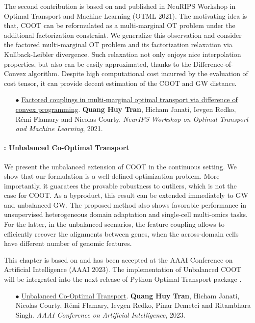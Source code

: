 The second contribution is based on \citep{Tran21} and published in NeuRIPS Workshop in Optimal
Transport and Machine Learning (OTML 2021). The motivating idea is that,
COOT can be reformulated as a multi-marginal OT problem under the additional factorization constraint.
We generalize this observation and consider the factored multi-marginal OT problem
and its factorization relaxation via Kullback-Leibler divergence.
Such relaxation not only enjoys nice interpolation properties, but also
can be easily approximated, thanks to the Difference-of-Convex algorithm.
Despite high computational cost incurred by the evaluation of cost tensor,
it can provide decent estimation of the COOT and GW distance.

\begin{itemize}
    \item[$\bullet$] \ul{Factored couplings in multi-marginal optimal transport via difference of
    convex programming}. \textbf{Quang Huy Tran}, Hicham Janati, Ievgen Redko,
    Rémi Flamary and Nicolas Courty.
    \textit{NeurIPS Workshop on Optimal Transport and Machine Learning}, 2021.
\end{itemize}

\paragraph{: Unbalanced Co-Optimal Transport}

We present the unbalanced extension of COOT in the continuous setting.
We show that our formulation is a well-defined optimization problem.
More importantly, it guaratees the provable robustness to outliers, which is not the case for COOT.
As a byproduct, this result can be extended immediately to GW and unbalanced GW.
The proposed method also shows favorable performance in
unsupervised heterogeneous domain adaptation and single-cell multi-omics tasks.
For the latter, in the unbalanced scenarios, the feature coupling allows to efficiently recover
the alignments between genes, when the across-domain cells have
different number of genomic features.

This chapter is based on \citep{Tran23} and has been accepted at the
AAAI Conference on Artificial Intelligence (AAAI 2023). The implementation of
Unbalanced COOT will be
integrated into the next release of Python Optimal Transport package \citep{Flamary21}.

\begin{itemize}
    \item[$\bullet$] \ul{Unbalanced Co-Optimal Transport}. \textbf{Quang Huy Tran}, Hicham Janati,
    Nicolas Courty, Rémi Flamary, Ievgen Redko, Pinar Demetci and Ritambhara Singh.
    \textit{AAAI Conference on Artificial Intelligence}, 2023.
\end{itemize}

